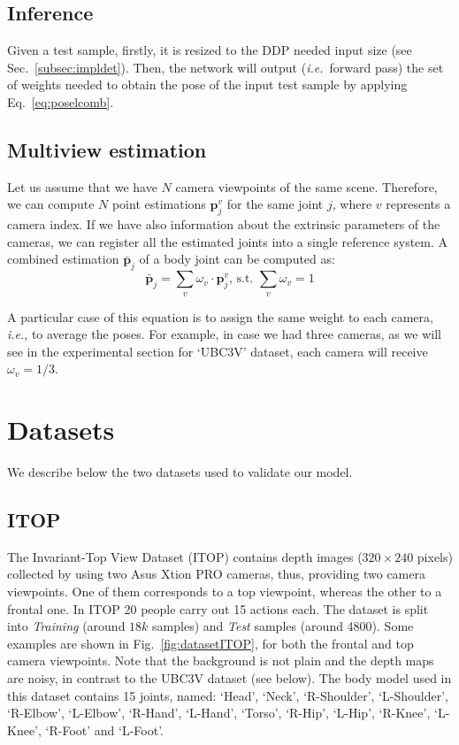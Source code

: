 \documentclass[review,12pt,3p]{elsarticle}
\def \ie{\textit{i.e.}}
\begin{document}
\subsection{Inference}\label{subsec:DDPinfer}
%
Given a test sample, firstly, it is resized to the DDP needed input size (see Sec.~\ref{subsec:impldet}). Then, the network will output (\ie~forward pass) the set of weights needed to obtain the pose of the input test sample by applying Eq.~\ref{eq:poselcomb}.

\subsection{Multiview estimation} \label{subsec:multiview}
%
Let us assume that we have $N$ camera viewpoints of the same scene. Therefore, we can compute $N$ point estimations $\mathbf{p}_j^v$ for the same joint $j$, where $v$ represents a camera index. If we have also information about the extrinsic parameters of the cameras, we can register all the estimated joints into a single reference system. A combined estimation $\mathbf{\bar{p}}_j$ of a body joint can be computed as:
\begin{equation}\label{eq:mcpt}
    \mathbf{\bar{p}}_j = \sum_v \omega_v \cdot \mathbf{p}_j^v \text{, s.t. } \sum_v \omega_v = 1
\end{equation}



A particular case of this equation is to assign the same weight to each camera, \ie, to average the poses. For example, in case we had three cameras, as we will see in the experimental section for `UBC3V' dataset, each camera will receive $\omega_v = 1/3$.

\section{Datasets} \label{sec:dataset}
%
We describe below the two datasets used to validate our model.

\subsection{ITOP} \label{subsec:dataitop}
The Invariant-Top View Dataset (ITOP) \cite{haque2016eccv} contains %
depth images ($320\times 240$ pixels) collected by using two Asus Xtion PRO cameras, thus, providing two camera viewpoints. One of them corresponds to a top viewpoint, whereas the other to a frontal one. In ITOP 20 people carry out 15 actions each. 
The dataset is split into \textit{Training} (around $18k$ samples) and \textit{Test} samples (around 4800).
Some examples are shown in Fig.~\ref{fig:datasetITOP}, for both the frontal and top camera viewpoints. Note that the background is not plain and the depth maps are noisy, in contrast to the UBC3V dataset (see below). 
 The body model used in this dataset contains 15 joints, named: `Head', `Neck', `R-Shoulder', `L-Shoulder', `R-Elbow', `L-Elbow', `R-Hand', `L-Hand', `Torso', `R-Hip', `L-Hip', `R-Knee', `L-Knee', `R-Foot' and `L-Foot'.
\end{document}
